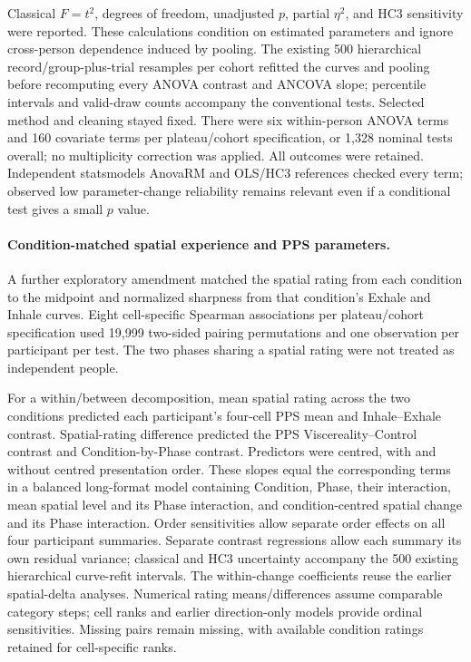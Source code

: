 Classical $F=t^2$, degrees of freedom, unadjusted $p$, partial $\eta^2$, and HC3 sensitivity were reported. These calculations condition on estimated parameters and ignore cross-person dependence induced by pooling. The existing 500 hierarchical record/group-plus-trial resamples per cohort refitted the curves and pooling before recomputing every ANOVA contrast and ANCOVA slope; percentile intervals and valid-draw counts accompany the conventional tests. Selected method and cleaning stayed fixed. There were six within-person ANOVA terms and 160 covariate terms per plateau/cohort specification, or 1,328 nominal tests overall; no multiplicity correction was applied. All outcomes were retained. Independent statsmodels AnovaRM and OLS/HC3 references checked every term; observed low parameter-change reliability remains relevant even if a conditional test gives a small $p$ value.


\paragraph{Condition-matched spatial experience and PPS parameters.}
A further exploratory amendment matched the spatial rating from each condition to the midpoint and normalized sharpness from that condition's Exhale and Inhale curves. Eight cell-specific Spearman associations per plateau/cohort specification used 19{,}999 two-sided pairing permutations and one observation per participant per test. The two phases sharing a spatial rating were not treated as independent people.

For a within/between decomposition, mean spatial rating across the two conditions predicted each participant's four-cell PPS mean and Inhale--Exhale contrast. Spatial-rating difference predicted the PPS Viscereality--Control contrast and Condition-by-Phase contrast. Predictors were centred, with and without centred presentation order. These slopes equal the corresponding terms in a balanced long-format model containing Condition, Phase, their interaction, mean spatial level and its Phase interaction, and condition-centred spatial change and its Phase interaction. Order sensitivities allow separate order effects on all four participant summaries. Separate contrast regressions allow each summary its own residual variance; classical and HC3 uncertainty accompany the 500 existing hierarchical curve-refit intervals. The within-change coefficients reuse the earlier spatial-delta analyses. Numerical rating means/differences assume comparable category steps; cell ranks and earlier direction-only models provide ordinal sensitivities. Missing pairs remain missing, with available condition ratings retained for cell-specific ranks.

